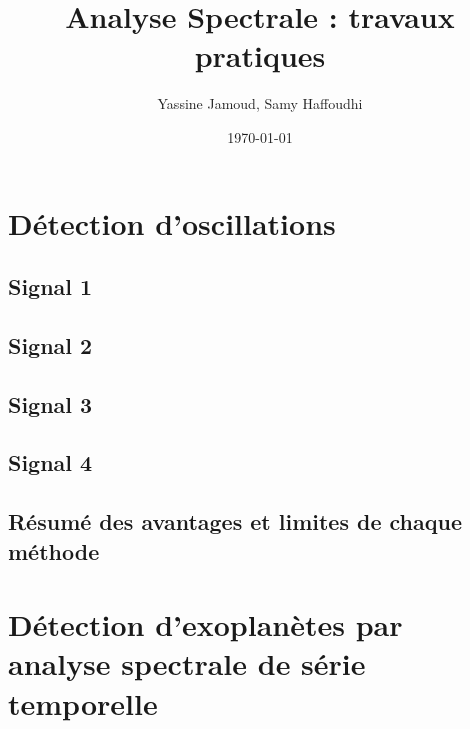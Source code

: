 \documentclass[12pt,a4paper,titlepage]{article}
\title{Analyse Spectrale : travaux pratiques}
\author{Yassine Jamoud, Samy Haffoudhi}
\date{\today}
\begin{document}
\maketitle

\section{Détection d'oscillations}

\subsection*{Signal 1}

\subsection*{Signal 2}

\subsection*{Signal 3}

\subsection*{Signal 4}

\subsection*{Résumé des avantages et limites de chaque méthode}

\section{Détection d'exoplanètes par analyse spectrale de série temporelle}
\end{document}
